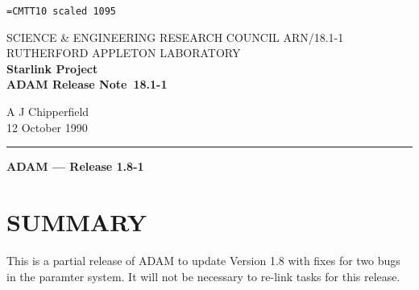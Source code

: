 \pagestyle{myheadings}

\newcommand{\stardoccategory}  {ADAM Release Note}
\newcommand{\stardocinitials}  {ARN}
\newcommand{\stardocnumber}    {18.1-1}
\newcommand{\stardocauthors}   {A J Chipperfield}
\newcommand{\stardocdate}      {12 October 1990}
\newcommand{\stardoctitle}     {ADAM --- Release 1.8-1}

\newcommand{\stardocname}{\stardocinitials /\stardocnumber}
\markright{\stardocname}
\setlength{\textwidth}{160mm}
\setlength{\textheight}{240mm}
\setlength{\topmargin}{-5mm}
\setlength{\oddsidemargin}{0mm}
\setlength{\evensidemargin}{0mm}
\setlength{\parindent}{0mm}
\setlength{\parskip}{\medskipamount}
\setlength{\unitlength}{1mm}


\font\tt=CMTT10 scaled 1095
\renewcommand{\_}{{\tt\char'137}}


\thispagestyle{empty}
SCIENCE \& ENGINEERING RESEARCH COUNCIL \hfill \stardocname\\
RUTHERFORD APPLETON LABORATORY\\
{\large\bf Starlink Project\\}
{\large\bf \stardoccategory\ \stardocnumber}
\begin{flushright}
\stardocauthors\\
\stardocdate
\end{flushright}
\vspace{-4mm}
\rule{\textwidth}{0.5mm}
\vspace{5mm}
\begin{center}
{\Large\bf \stardoctitle}
\end{center}
\vspace{5mm}

\section{SUMMARY}
This is a partial release of ADAM to update Version 1.8 with fixes for two 
bugs in the paramter system.
It will not be necessary to re-link tasks for this release.

